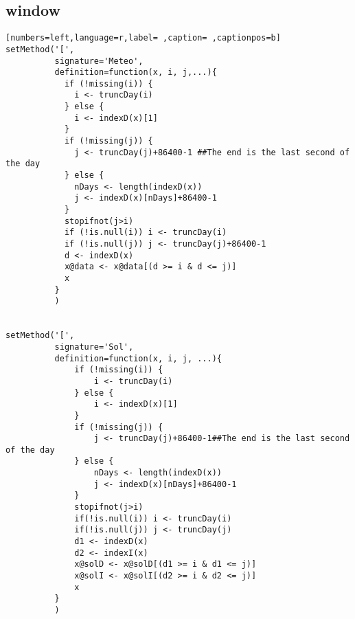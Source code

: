\subsection{window}
\label{sec:org62583d0}
\begin{lstlisting}[numbers=left,language=r,label= ,caption= ,captionpos=b]
setMethod('[',
          signature='Meteo',
          definition=function(x, i, j,...){
            if (!missing(i)) {
              i <- truncDay(i)
            } else {
              i <- indexD(x)[1]
            }
            if (!missing(j)) {
              j <- truncDay(j)+86400-1 ##The end is the last second of the day
            } else {
              nDays <- length(indexD(x))
              j <- indexD(x)[nDays]+86400-1
            }
            stopifnot(j>i)
            if (!is.null(i)) i <- truncDay(i)
            if (!is.null(j)) j <- truncDay(j)+86400-1
            d <- indexD(x)
            x@data <- x@data[(d >= i & d <= j)]
            x
          }
          )


setMethod('[',
          signature='Sol',
          definition=function(x, i, j, ...){
              if (!missing(i)) {
                  i <- truncDay(i)
              } else {
                  i <- indexD(x)[1]
              }
              if (!missing(j)) {
                  j <- truncDay(j)+86400-1##The end is the last second of the day
              } else {
                  nDays <- length(indexD(x))
                  j <- indexD(x)[nDays]+86400-1
              }
              stopifnot(j>i)
              if(!is.null(i)) i <- truncDay(i)
              if(!is.null(j)) j <- truncDay(j)
              d1 <- indexD(x)
              d2 <- indexI(x)
              x@solD <- x@solD[(d1 >= i & d1 <= j)]
              x@solI <- x@solI[(d2 >= i & d2 <= j)]
              x
          }
          )


\end{lstlisting}
